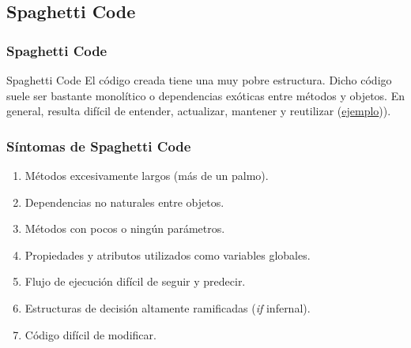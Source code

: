﻿\documentclass[animated,a4paper,slidestop,xcolor=pst,blue]{beamer}
\begin{document}
%

\subsection{Spaghetti Code}

\begin{frame}[c]
	\frametitle{Spaghetti Code}
    \begin{block}{Spaghetti Code}
        El código creada tiene una muy pobre estructura. Dicho código suele ser bastante
        monolítico o dependencias exóticas entre métodos y objetos. En general,  resulta difícil de entender, actualizar, mantener y reutilizar (\href{http://imgs.xkcd.com/comics/goto.png}{ejemplo})).
    \end{block}
\end{frame}

\begin{frame}[c]
	\frametitle{Síntomas de Spaghetti Code}
    \begin{enumerate}[<+->]
        \item Métodos excesivamente largos (más de un palmo).
        \item Dependencias no naturales entre objetos.
        \item Métodos con pocos o ningún parámetros.
        \item Propiedades y atributos utilizados como variables globales.
        \item Flujo de ejecución difícil de seguir y predecir.
        \item Estructuras de decisión altamente ramificadas (\emph{if} infernal).
        \item Código difícil de modificar.
    \end{enumerate}
\end{frame}
\end{document}
